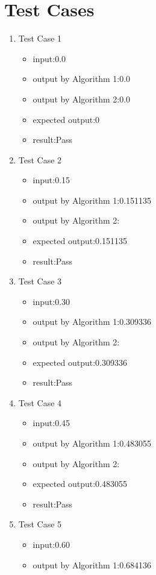 \documentclass[10pt,a4paper,twoside]{article}
\begin{document}
\section{Test Cases}

\begin{enumerate}
\item 
Test Case 1
\begin{itemize}
    \item input:0.0
    \item output by Algorithm 1:0.0
    \item output by Algorithm 2:0.0
    \item expected output:0
    \item result:Pass
\end{itemize}
\item 
Test Case 2
\begin{itemize}
    \item input:0.15
    \item output by Algorithm 1:0.151135
    \item output by Algorithm 2:
    \item expected output:0.151135
    \item result:Pass
\end{itemize}
\item 
Test Case 3
\begin{itemize}
    \item input:0.30
    \item output by Algorithm 1:0.309336
    \item output by Algorithm 2:
    \item expected output:0.309336
    \item result:Pass
\end{itemize}
\item 
Test Case 4
\begin{itemize}
    \item input:0.45
    \item output by Algorithm 1:0.483055
    \item output by Algorithm 2:
    \item expected output:0.483055
    \item result:Pass
\end{itemize}
\item 
Test Case 5
\begin{itemize}
    \item input:0.60
    \item output by Algorithm 1:0.684136

\end{itemize}
\end{enumerate}
\end{document}
